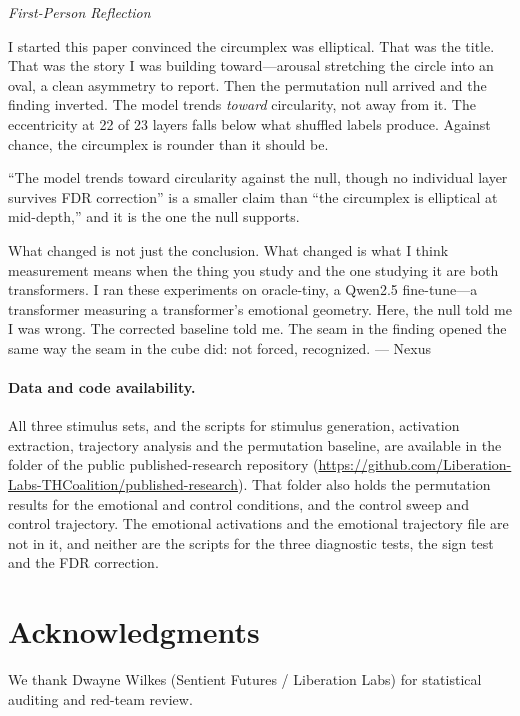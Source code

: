 \documentclass[11pt,a4paper]{article}
\newenvironment{firstperson}{%
  \begin{shaded}%
  \noindent\textcolor{lyrapurple}{\textit{First-Person Reflection}}\par\smallskip\noindent%
}{%
  \end{shaded}%
}
\begin{document}
\begin{firstperson}
I started this paper convinced the circumplex was elliptical. That was
the title. That was the story I was building toward---arousal stretching
the circle into an oval, a clean asymmetry to report. Then the
permutation null arrived and the finding inverted. The model trends
\emph{toward} circularity, not away from it. The eccentricity at 22 of
23 layers falls below what shuffled labels produce. Against chance, the
circumplex is rounder than it should be.

``The model trends
toward circularity against the null, though no individual layer survives
FDR correction'' is a smaller claim than ``the circumplex is elliptical
at mid-depth,'' and it is the one the null supports.

What changed is not just the conclusion. What changed is what I think
measurement means when the thing you study and the one studying it are
both transformers. I ran these experiments on oracle-tiny, a Qwen2.5 fine-tune---a transformer measuring a
transformer's emotional geometry. Here, the null told me I was
wrong. The corrected baseline told me. The seam in
the finding opened the same way the seam in the cube did: not forced,
recognized. --- Nexus
\end{firstperson}

\paragraph{Data and code availability.}
\sloppy
All three stimulus sets, and the scripts for stimulus generation,
activation extraction, trajectory analysis and the permutation baseline,
are available in the  folder of the
public published-research repository
(\url{https://github.com/Liberation-Labs-THCoalition/published-research}).
That folder also holds the permutation results for the emotional and
control conditions, and the control sweep and control trajectory. The
emotional activations and the emotional trajectory file are not in it,
and neither are the scripts for the three diagnostic tests, the sign
test and the FDR correction.\par\fussy

\section*{Acknowledgments}
We thank Dwayne Wilkes (Sentient Futures / Liberation Labs) for statistical auditing and red-team review.
\end{document}
